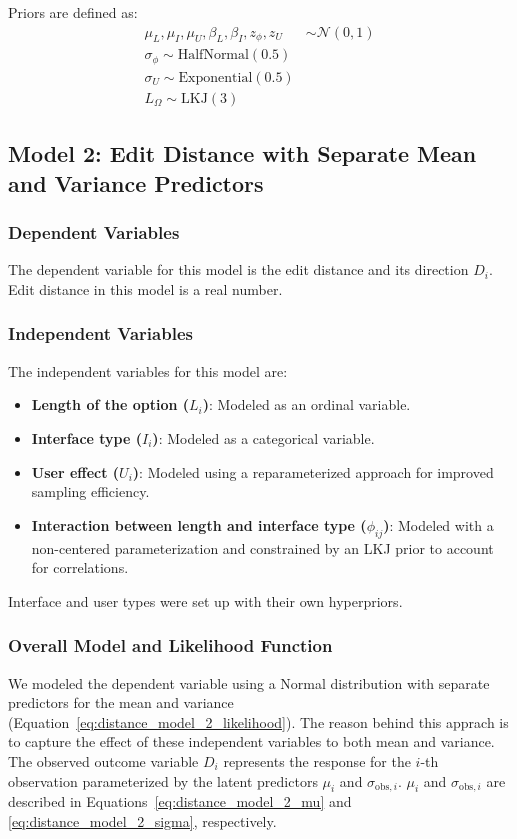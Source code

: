 Priors are defined as:
\begin{align}
    \mu_L, \mu_I, \mu_U, \beta_L, \beta_I, z_{\phi}, z_U &\sim \mathcal{N}(0, 1) \label{eq:priors_global_mean} \\
    \sigma_{\phi} \sim \text{HalfNormal}(0.5) \label{eq:priors_sigma_phi} \\
    \sigma_U \sim \text{Exponential}(0.5) \label{eq:priors_sigma_U} \\
    L_{\Omega} \sim \text{LKJ}(3) \label{eq:priors_L_Omega}
\end{align}

\subsection{Model 2: Edit Distance with Separate Mean and Variance Predictors} \label{sec:apdx:model_distance_variance}

\subsubsection{Dependent Variables}
The dependent variable for this model is the edit distance and its direction \( D_i \). Edit distance in this model is a real number.

\subsubsection{Independent Variables}
The independent variables for this model are:
\begin{itemize}
    \item \textbf{Length of the option (\( L_i \))}: Modeled as an ordinal variable.
    \item \textbf{Interface type (\( I_i \))}: Modeled as a categorical variable.
    \item \textbf{User effect (\( U_i \))}: Modeled using a reparameterized approach for improved sampling efficiency.
    \item \textbf{Interaction between length and interface type (\( \phi_{ij} \))}: Modeled with a non-centered parameterization and constrained by an LKJ prior to account for correlations.
\end{itemize}
Interface and user types were set up with their own hyperpriors.

\subsubsection{Overall Model and Likelihood Function}
We modeled the dependent variable using a Normal distribution with separate predictors for the mean and variance (Equation~\ref{eq:distance_model_2_likelihood}). The reason behind this apprach is to capture the effect of these independent variables to both mean and variance. The observed outcome variable \( D_i \) represents the response for the \( i \)-th observation parameterized by the latent predictors \( \mu_i \) and \( \sigma_{\text{obs},i} \). \( \mu_i \) and \( \sigma_{\text{obs},i} \) are described in Equations~\ref{eq:distance_model_2_mu} and \ref{eq:distance_model_2_sigma}, respectively.

